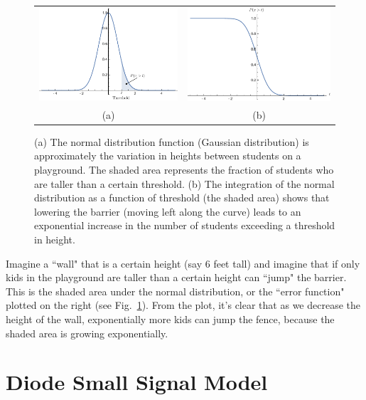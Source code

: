 \begin{figure}[tb]
\begin{center}
\begin{tabular}{cc}
\includegraphics[width=.5\columnwidth]{norm4} &
\includegraphics[width=.5\columnwidth]{erf} \\
(a) & (b) \\
\end{tabular}
\end{center}
\caption{(a) The normal distribution function (Gaussian distribution) is approximately the variation in heights between students on a playground.  The shaded area represents the fraction of students who are taller than a certain threshold.  (b)  The integration of the normal distribution as a function of threshold (the shaded area) shows that lowering the barrier (moving left along the curve) leads to an exponential increase in the number of students exceeding a threshold in height.   } \label{fig:norm4}
\end{figure}

Imagine a ``wall" that is a certain height (say 6 feet tall) and imagine that if only kids in the playground are taller than a certain height can ``jump" the barrier.  This is the shaded area under the normal distribution, or the ``error function" plotted on the right (see Fig.~\ref{fig:norm4}).   From the plot, it's clear that as we decrease the height of the wall, exponentially more kids can jump the fence, because the shaded area is growing exponentially.  
 


\section{Diode Small Signal Model}

